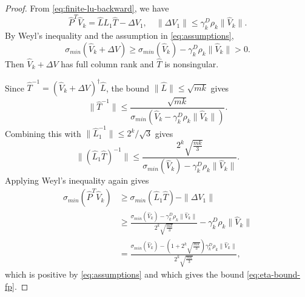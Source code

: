 \documentclass[12pt, a4paper]{article}
\newcommand{\Vhat}{\widehat{V}}
\newcommand{\Lhat}{\widehat{L}}
\newcommand{\Phat}{\widehat{P}}
\newcommand{\That}{\widehat{T}}
\theoremstyle{remark}
\begin{document}
\begin{proof}


From \eqref{eq:finite-lu-backward}, we have
\[
\Phat^T\Vhat_k = \Lhat{L}_1 \That - \Delta V_1, \quad \|\Delta V_1 \| \leq \gamma^D_k \rho_k \|\Vhat_k\|.
\]
By Weyl's inequality and the assumption in \eqref{eq:assumptions}, 
\[
\sigma_{min}(\Vhat_k + \Delta V) \geq \sigma_{min}(\Vhat_k)-\gamma^D_k \rho_k \|\Vhat_k\| > 0.
\]
Then $\Vhat_k + \Delta V$ has full column rank and $\That$ is nonsingular. 

Since $\That^{-1} = (\Vhat_k + \Delta V)^\dagger \Lhat$, the bound $\|\Lhat\|\leq \sqrt{mk}$ gives
\[
\| \That^{-1}\|\leq \frac{\sqrt{mk}}{\sigma_{min}(\Vhat_k-\gamma^D_k \rho_k \|\Vhat_k \|)}.
\]
Combining this with $\|\Lhat_1^{-1}\|\leq 2^k/\sqrt{3}$ gives
\[
\| (\Lhat_1 \That)^{-1}\| \leq \frac{2^k \sqrt{\frac{mk}{3}}}{\sigma_{min}(\Vhat_k)-\gamma^D_k \rho_k \|\Vhat_k\|}.
\]
Applying Weyl's inequality again gives
\begin{align*}
\sigma_{min}(\Phat^T\Vhat_k) &\geq \sigma_{min}(\Lhat_1 \That) - \|\Delta V_1 \| \\
&\geq \frac{\sigma_{min}(\Vhat_k)-\gamma^D_k \rho_k \|\Vhat_k\|}{2^k \sqrt{\frac{mk}{3}}}-\gamma^D_k\rho_k\|\Vhat_k\|\\
&= \frac{\sigma_{min}(\Vhat_k) - \left(1+2^k\sqrt{\frac{mk}{3}}\right)\gamma^D_k \rho_k \|\Vhat_k\|}{2^k \sqrt{\frac{mk}{3}}},
\end{align*}
which is positive by \eqref{eq:assumptions} and which gives the bound \eqref{eq:eta-bound-fp}.

\end{proof}
\end{document}
